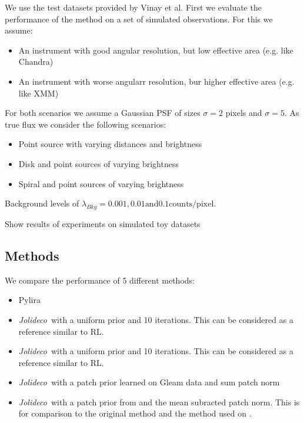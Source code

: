 \documentclass[twocolumn]{aastex631}
\newcommand{\jolideco}{\textit{Jolideco}~}
\begin{document}
    We use the test datasets provided by Vinay et al.
    First we evaluate the performance of the method on a set of simulated observations.
    For this we assume:

    \begin{itemize}
        \item An instrument with good angular resolution, but low effective area (e.g. like Chandra)
        \item An instrument with worse angularr resolution, bur higher effective area (e.g. like XMM)
    \end{itemize}

    For both scenarios we assume a Gaussian PSF of sizes $\sigma = 2$ pixels and  $\sigma = 5$.
    As true flux we consider the following scenarios:

    \begin{itemize}
        \item Point source with varying distances and brightness
        \item Disk and point sources of varying brightness
        \item Spiral and point sources of varying brightness
    \end{itemize}

    Background levels of $\lambda_{Bkg}= 0.001, 0.01 \textrm{and} 0.1 \textrm{counts/pixel}$. 
    
    Show results of experiments on simulated toy datasets

    \subsection{Methods}
    We compare the performance of 5 different methods:

    \begin{itemize}
        \item Pylira \citep{Esch2004, scipy_proceeding}
        \item \jolideco with a uniform prior and 10 iterations. This can be considered as a reference similar to RL.
        \item \jolideco with a uniform prior and 10 iterations. This can be considered as a reference similar to RL.
        \item \jolideco with a patch prior learned on Gleam data and sum patch norm
        \item \jolideco with a patch prior from \cite{Zoran2011} and the mean subracted patch norm. This is for comparison to the original method and the method used on \cite{Bouman2016}.
    \end{itemize}
    
\end{document}
